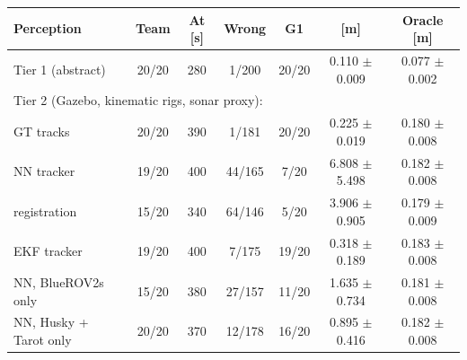 \begin{tabular}{lcccccc}
\toprule
Perception & Team & At [s] & Wrong & G1 & \avatar{} [m] & Oracle [m] \\
\midrule
Tier 1 (abstract) & 20/20 & 280 & 1/200 & 20/20 & 0.110 $\pm$ 0.009 & 0.077 $\pm$ 0.002 \\
\multicolumn{7}{l}{Tier 2 (Gazebo, kinematic rigs, sonar proxy):} \\
\quad GT tracks & 20/20 & 390 & 1/181 & 20/20 & 0.225 $\pm$ 0.019 & 0.180 $\pm$ 0.008 \\
\quad NN tracker & 19/20 & 400 & 44/165 & 7/20 & 6.808 $\pm$ 5.498 & 0.182 $\pm$ 0.008 \\
\quad registration & 15/20 & 340 & 64/146 & 5/20 & 3.906 $\pm$ 0.905 & 0.179 $\pm$ 0.009 \\
\quad EKF tracker & 19/20 & 400 & 7/175 & 19/20 & 0.318 $\pm$ 0.189 & 0.183 $\pm$ 0.008 \\
\quad NN, BlueROV2s only & 15/20 & 380 & 27/157 & 11/20 & 1.635 $\pm$ 0.734 & 0.181 $\pm$ 0.008 \\
\quad NN, Husky + Tarot only & 20/20 & 370 & 12/178 & 16/20 & 0.895 $\pm$ 0.416 & 0.182 $\pm$ 0.008 \\
\bottomrule
\end{tabular}

